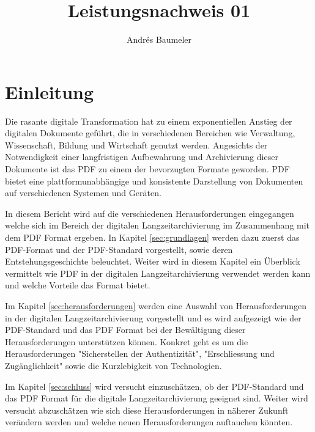\documentclass[a4paper,oneside, 12pt]{report}
\title{Leistungsnachweis 01}
\author{Andrés Baumeler}
\begin{document}

\pagestyle{empty} %





\cleardoublepage
\tableofcontents %
\cleardoublepage %

\pagestyle{plain} %



\chapter{Einleitung}\label{sec:motivation}
Die rasante digitale Transformation hat zu einem exponentiellen Anstieg der digitalen Dokumente geführt, die in verschiedenen Bereichen wie Verwaltung, Wissenschaft, Bildung und Wirtschaft genutzt werden. Angesichts der Notwendigkeit einer langfristigen Aufbewahrung und Archivierung dieser Dokumente ist das \ac{PDF} zu einem der bevorzugten Formate geworden. \ac{PDF} bietet eine plattformunabhängige und konsistente Darstellung von Dokumenten auf verschiedenen Systemen und Geräten.

In diesem Bericht wird auf die verschiedenen Herausforderungen eingegangen welche sich im Bereich der digitalen Langzeitarchivierung im Zusammenhang mit dem \ac{PDF} Format ergeben. In Kapitel \ref{sec:grundlagen} werden dazu zuerst das \ac{PDF}-Format und der \ac{PDF}-Standard vorgestellt, sowie deren Entstehungsgeschichte beleuchtet. Weiter wird in diesem Kapitel ein Überblick vermittelt wie \ac{PDF} in der digitalen Langzeitarchivierung verwendet werden kann und welche Vorteile das Format bietet. 

Im Kapitel \ref{sec:herausforderungen} werden eine Auswahl von Herausforderungen in der digitalen Langzeitarchivierung vorgestellt und es wird aufgezeigt wie der PDF-Standard und das PDF Format bei der Bewältigung dieser Herausforderungen unterstützen können. Konkret geht es um die Herausforderungen "Sicherstellen der Authentizität", "Erschliessung und Zugänglichkeit" sowie die Kurzlebigkeit von Technologien.

Im Kapitel \ref{sec:schluss} wird versucht einzuschätzen, ob der PDF-Standard und das PDF Format für die digitale Langzeitarchivierung geeignet sind. Weiter wird versucht abzuschätzen wie sich diese Herausforderungen in näherer Zukunft verändern werden und welche neuen Herausforderungen auftauchen könnten.
\end{document}
